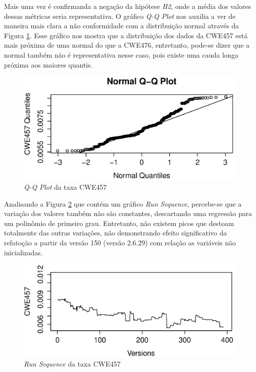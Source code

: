Mais uma vez é confirmanda a negação da hipótese \textit{H2}, onde a média dos
valores dessas métricas seria representativa. O gráfico \textit{Q-Q Plot} nos
auxilia a ver de maneira mais clara a não conformidade com a distribuição normal
através da Figura \ref{fig:cwe457-qq-plot}. Esse gráfico nos mostra que a
distribuição dos dados da CWE457 está mais próxima de uma normal do que a
CWE476, entretanto, pode-se dizer que a normal também não é representativa nesse
caso, pois existe uma cauda longa próxima aos maiores quantis.

\begin{figure}[h]
  \centering
  \includegraphics[width=1.0\textwidth]
      {figuras/cwe457-qq-plot.eps}
      \caption{\textit{Q-Q Plot} da taxa CWE457}
  \label{fig:cwe457-qq-plot}
\end{figure}

Analisando a Figura \ref{fig:cwe457-run-sequence} que contém um gráfico
\textit{Run Sequence}, percebe-se que a variação dos valores também não são
constantes, descartando uma regressão para um polinômio de primeiro grau.
Entretanto, não existem picos que destoam totalmente das outras variações, não
demonstrando efeito significativo da refatoção a partir da versão 150 (versão
2.6.29) com relação as variáveis não inicializadas.

\begin{figure}[h]
  \centering
  \includegraphics[width=1.0\textwidth]
      {figuras/cwe457-run-sequence.eps}
      \caption{\textit{Run Sequence} da taxa CWE457}
  \label{fig:cwe457-run-sequence}
\end{figure}

